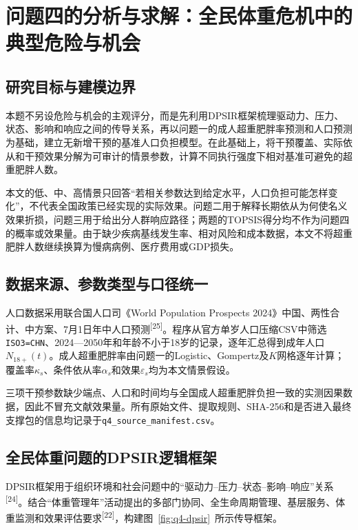 \section{问题四的分析与求解：全民体重危机中的典型危险与机会}

\subsection{研究目标与建模边界}

本题不另设危险与机会的主观评分，而是先利用DPSIR框架梳理驱动力、压力、状态、影响和响应之间的传导关系，再以问题一的成人超重肥胖率预测和人口预测为基础，建立无新增干预的基准人口负担模型。在此基础上，将干预覆盖、实际依从和干预效果分解为可审计的情景参数，计算不同执行强度下相对基准可避免的超重肥胖人数。

本文的低、中、高情景只回答“若相关参数达到给定水平，人口负担可能怎样变化”，不代表全国政策已经实现的实际效果。问题二用于解释长期依从为何使名义效果折损，问题三用于给出分人群响应路径；两题的TOPSIS得分均不作为问题四的概率或效果量。由于缺少疾病基线发生率、相对风险和成本数据，本文不将超重肥胖人数继续换算为慢病病例、医疗费用或GDP损失。

\subsection{数据来源、参数类型与口径统一}

人口数据采用联合国人口司《World Population Prospects 2024》中国、两性合计、中方案、7月1日年中人口预测\textsuperscript{[25]}。程序从官方单岁人口压缩CSV中筛选\texttt{ISO3=CHN}、2024---2050年和年龄不小于18岁的记录，逐年汇总得到成年人口$N_{18+}(t)$。成人超重肥胖率由问题一的Logistic、Gompertz及$K$网格逐年计算；覆盖率$\kappa_s$、条件依从率$\alpha_s$和效果$\varepsilon_s$均为本文情景假设。

三项干预参数缺少端点、人口和时间均与全国成人超重肥胖负担一致的实测因果数据，因此不冒充文献效果量。所有原始文件、提取规则、SHA-256和是否进入最终支撑包的信息均记录于\texttt{q4\_source\_manifest.csv}。

\subsection{全民体重问题的DPSIR逻辑框架}

DPSIR框架用于组织环境和社会问题中的“驱动力--压力--状态--影响--响应”关系\textsuperscript{[24]}。结合“体重管理年”活动提出的多部门协同、全生命周期管理、基层服务、体重监测和效果评估要求\textsuperscript{[22]}，构建图~\ref{fig:q4-dpsir}~所示传导框架。

